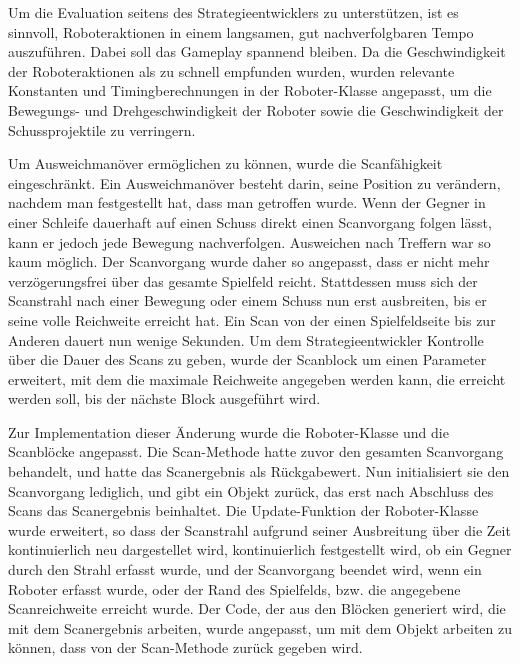Um die Evaluation seitens des Strategieentwicklers zu unterstützen, ist es sinnvoll, Roboteraktionen
in einem langsamen, gut nachverfolgbaren Tempo auszuführen. Dabei soll das Gameplay spannend
bleiben. Da die Geschwindigkeit der Roboteraktionen als zu schnell empfunden wurden, wurden
relevante Konstanten und Timingberechnungen in der Roboter-Klasse angepasst, um die Bewegungs- und
Drehgeschwindigkeit der Roboter sowie die Geschwindigkeit der Schussprojektile zu verringern.

Um Ausweichmanöver ermöglichen zu können, wurde die Scanfähigkeit eingeschränkt. Ein Ausweichmanöver
besteht darin, seine Position zu verändern, nachdem man festgestellt hat, dass man getroffen wurde.
Wenn der Gegner in einer Schleife dauerhaft auf einen Schuss direkt einen Scanvorgang folgen lässt,
kann er jedoch jede Bewegung nachverfolgen. Ausweichen nach Treffern war so kaum möglich. Der
Scanvorgang wurde daher so angepasst, dass er nicht mehr verzögerungsfrei über das gesamte
Spielfeld reicht. Stattdessen muss sich der Scanstrahl nach einer Bewegung oder einem Schuss nun
erst ausbreiten, bis er seine volle Reichweite erreicht hat. Ein Scan von der einen Spielfeldseite
bis zur Anderen dauert nun wenige Sekunden. Um dem Strategieentwickler Kontrolle über die Dauer des Scans
zu geben, wurde der Scanblock um einen Parameter erweitert, mit dem die maximale Reichweite
angegeben werden kann, die erreicht werden soll, bis der nächste Block ausgeführt wird.

Zur Implementation dieser Änderung wurde die Roboter-Klasse und die Scanblöcke angepasst. Die
Scan-Methode hatte zuvor den gesamten Scanvorgang behandelt, und hatte das Scanergebnis als
Rückgabewert. Nun initialisiert sie den Scanvorgang lediglich, und gibt ein Objekt zurück, das erst
nach Abschluss des Scans das Scanergebnis beinhaltet. Die Update-Funktion der Roboter-Klasse wurde
erweitert, so dass der Scanstrahl aufgrund seiner Ausbreitung über die Zeit kontinuierlich neu
dargestellet wird, kontinuierlich festgestellt wird, ob ein Gegner durch den Strahl erfasst wurde,
und der Scanvorgang beendet wird, wenn ein Roboter erfasst wurde, oder der Rand des Spielfelds, bzw.
die angegebene Scanreichweite erreicht wurde. Der Code, der aus den Blöcken generiert wird, die mit
dem Scanergebnis arbeiten, wurde angepasst, um mit dem Objekt arbeiten zu können, dass von der
Scan-Methode zurück gegeben wird.
